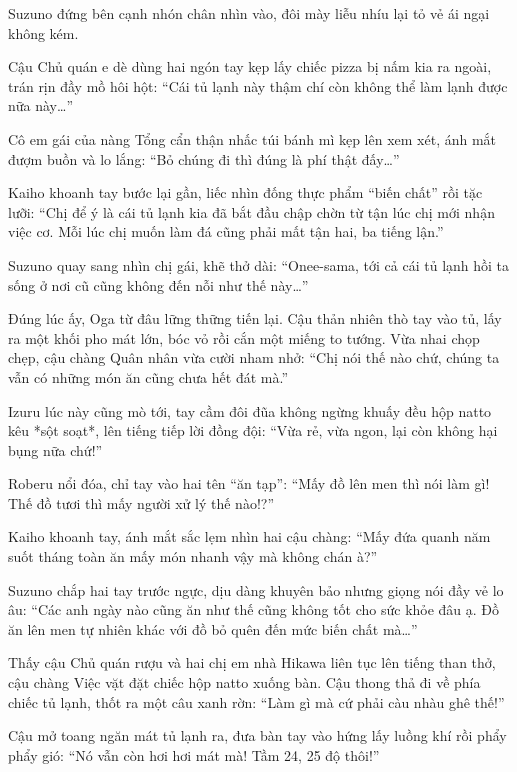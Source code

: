 \documentclass[../main.tex]{subfiles}
\begin{document}

Suzuno đứng bên cạnh nhón chân nhìn vào, đôi mày liễu nhíu lại tỏ vẻ ái ngại không kém.

Cậu Chủ quán e dè dùng hai ngón tay kẹp lấy chiếc pizza bị nấm kia ra ngoài, trán rịn đầy mồ hôi hột: ``Cái tủ lạnh này thậm chí còn không thể làm lạnh được nữa này\dots''

Cô em gái của nàng Tổng cẩn thận nhấc túi bánh mì kẹp lên xem xét, ánh mắt đượm buồn và lo lắng: ``Bỏ chúng đi thì đúng là phí thật đấy\dots''

Kaiho khoanh tay bước lại gần, liếc nhìn đống thực phẩm ``biến chất'' rồi tặc lưỡi: ``Chị để ý là cái tủ lạnh kia đã bắt đầu chập chờn từ tận lúc chị mới nhận việc cơ. Mỗi lúc chị muốn làm đá cũng phải mất tận hai, ba tiếng lận.''

Suzuno quay sang nhìn chị gái, khẽ thở dài: ``Onee-sama, tới cả cái tủ lạnh hồi ta sống ở nơi cũ cũng không đến nỗi như thế này\dots''

Đúng lúc ấy, Oga từ đâu lững thững tiến lại. Cậu thản nhiên thò tay vào tủ, lấy ra một khối pho mát lớn, bóc vỏ rồi cắn một miếng to tướng. Vừa nhai chọp chẹp, cậu chàng Quân nhân vừa cười nham nhở: ``Chị nói thế nào chứ, chúng ta vẫn có những món ăn cũng chưa hết đát mà.''

Izuru lúc này cũng mò tới, tay cầm đôi đũa không ngừng khuấy đều hộp natto kêu *sột soạt*, lên tiếng tiếp lời đồng đội: ``Vừa rẻ, vừa ngon, lại còn không hại bụng nữa chứ!''

Roberu nổi đóa, chỉ tay vào hai tên ``ăn tạp'': ``Mấy đồ lên men thì nói làm gì! Thế đồ tươi thì mấy người xử lý thế nào!?''


Kaiho khoanh tay, ánh mắt sắc lẹm nhìn hai cậu chàng: ``Mấy đứa quanh năm suốt tháng toàn ăn mấy món nhanh vậy mà không chán à?''

Suzuno chắp hai tay trước ngực, dịu dàng khuyên bảo nhưng giọng nói đầy vẻ lo âu: ``Các anh ngày nào cũng ăn như thế cũng không tốt cho sức khỏe đâu ạ. Đồ ăn lên men tự nhiên khác với đồ bỏ quên đến mức biến chất mà\dots''

Thấy cậu Chủ quán rượu và hai chị em nhà Hikawa liên tục lên tiếng than thở, cậu chàng Việc vặt đặt chiếc hộp natto xuống bàn. Cậu thong thả đi về phía chiếc tủ lạnh, thốt ra một câu xanh rờn: ``Làm gì mà cứ phải càu nhàu ghê thế!''

Cậu mở toang ngăn mát tủ lạnh ra, đưa bàn tay vào hứng lấy luồng khí rồi phẩy phẩy gió: ``Nó vẫn còn hơi hơi mát mà! Tầm 24, 25 độ thôi!''
\end{document}
